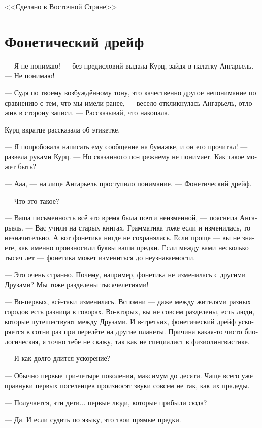 \documentclass[a4paper,12pt,fleqn]{book}\usepackage{polyglossia}\setdefaultlanguage[babelshorthands=true]{russian}\setotherlanguage{english}\defaultfontfeatures{Ligatures=TeX,Mapping=tex-text}\usepackage{xcolor}\newcommand{\ml}[3]{#2}
\begin{document}
\ml{$0$}
{<<Сделано в Восточной Стране>>}
{\textsc{Made in Eastern Realm}}

\section{Фонетический дрейф}

--- Я не понимаю! --- без предисловий выдала Курц, зайдя в палатку Ангарьель.
--- Не понимаю!

--- Судя по твоему возбуждённому тону, это качественно другое непонимание по сравнению с тем, что мы имели ранее, --- весело откликнулась Ангарьель, отложив в сторону записи.
--- Рассказывай, что накопала.

Курц вкратце рассказала об этикетке.

--- Я попробовала написать ему сообщение на бумажке, и он его прочитал! --- развела руками Курц.
--- Но сказанного по-прежнему не понимает.
Как такое может быть?

--- Ааа, --- на лице Ангарьель проступило понимание.
--- Фонетический дрейф.

--- Что это такое?

--- Ваша письменность всё это время была почти неизменной, --- пояснила Ангарьель.
--- Вас учили на старых книгах.
Грамматика тоже если и изменилась, то незначительно.
А вот фонетика нигде не сохранялась.
Если проще --- вы не знаете, как именно произносили буквы ваши предки.
Если между вами несколько тысяч лет --- фонетика может измениться до неузнаваемости.

--- Это очень странно.
Почему, например, фонетика не изменилась с другими Друзами?
Мы тоже разделены тысячелетиями!

--- Во-первых, всё-таки изменилась.
Вспомни --- даже между жителями разных городов есть разница в говорах.
Во-вторых, вы не совсем разделены, есть люди, которые путешествуют между Друзами.
И в-третьих, фонетический дрейф ускоряется в сотни раз при перелёте на другие планеты.
Причина какая-то чисто биологическая, я точно тебе не скажу, так как не специалист в физиолингвистике.

--- И как долго длится ускорение?

--- Обычно первые три-четыре поколения, максимум до десяти.
Чаще всего уже правнуки первых поселенцев произносят звуки совсем не так, как их прадеды.

--- Получается, эти дети... первые люди, которые прибыли сюда?

--- Да.
И если судить по языку, это твои прямые предки.
\end{document}
